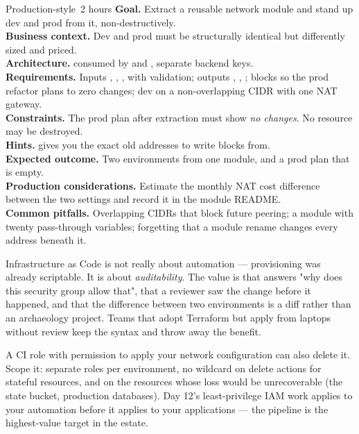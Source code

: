 \begin{minilab}{Production-style}{~2 hours}
\textbf{Goal.} Extract a reusable network module and stand up dev and prod from it, non-destructively.\\
\textbf{Business context.} Dev and prod must be structurally identical but differently sized and priced.\\
\textbf{Architecture.}  consumed by  and , separate backend keys.\\
\textbf{Requirements.} Inputs , , ,  with validation; outputs , , ;  blocks so the prod refactor plans to zero changes; dev on a non-overlapping CIDR with one NAT gateway.\\
\textbf{Constraints.} The prod plan after extraction must show \emph{no changes}. No resource may be destroyed.\\
\textbf{Hints.}  gives you the exact old addresses to write  blocks from.\\
\textbf{Expected outcome.} Two environments from one module, and a prod plan that is empty.\\
\textbf{Production considerations.} Estimate the monthly NAT cost difference between the two settings and record it in the module README.\\
\textbf{Common pitfalls.} Overlapping CIDRs that block future peering; a module with twenty pass-through variables; forgetting that a module rename changes every address beneath it.
\end{minilab}


\begin{infranote}
Infrastructure as Code is not really about automation --- provisioning was already scriptable. It is about \emph{auditability}. The value is that  answers "why does this security group allow that", that a reviewer saw the change before it happened, and that the difference between two environments is a diff rather than an archaeology project. Teams that adopt Terraform but apply from laptops without review keep the syntax and throw away the benefit.
\end{infranote}

\begin{secwarn}
A CI role with permission to apply your network configuration can also delete it. Scope it: separate roles per environment, no wildcard \code{*} on delete actions for stateful resources, and  on the resources whose loss would be unrecoverable (the state bucket, production databases). Day 12's least-privilege IAM work applies to your automation before it applies to your applications --- the pipeline is the highest-value target in the estate.
\end{secwarn}

